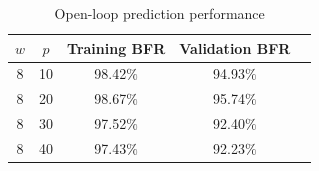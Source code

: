 \documentclass{ifacconf}
\begin{document}
\begin{table}[t]
\caption{Open-loop prediction performance}
\label{tab:BFR}
\begin{center}
\begin{tabular}{c c c c c}
\hline
\textbf{$w$} & \textbf{$p$} & \textbf{Training BFR} & \textbf{Validation BFR}\\
\hline
8 & 10 & 98.42\(\%\) & 94.93\(\%\)\\
\hline
8 & 20 & 98.67\(\%\) & 95.74\(\%\)\\
\hline
8 & 30 & 97.52\(\%\) & 92.40\(\%\)\\
\hline
8 & 40 & 97.43\(\%\) & 92.23\(\%\) \\
\hline
\end{tabular}
\end{center}
\end{table}





\end{document}
